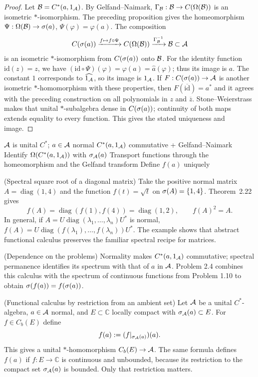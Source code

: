 \begin{proof}[Proof]
Let $\mathcal B=C^*(a,1_\mathcal A)$. By Gelfand--Naimark,
$\Gamma_\mathcal B:\mathcal B\to C(\Omega(\mathcal B))$ is an isometric $*$-isomorphism.
The preceding proposition gives the homeomorphism
$\Psi:\Omega(\mathcal B)\to\sigma(a)$, $\Psi(\varphi)=\varphi(a)$. The composition
\[
 C(\sigma(a))\xrightarrow{f\mapsto f\circ\Psi} C(\Omega(\mathcal B))
 \xrightarrow{\Gamma_\mathcal B^{-1}}\mathcal B\subset\mathcal A
\]
is an isometric $*$-isomorphism from $C(\sigma(a))$ onto $\mathcal B$.
For the identity function $\mathrm{id}(z)=z$, we have
$(\mathrm{id}\circ\Psi)(\varphi)=\varphi(a)=\widehat a(\varphi)$;
thus its image is $a$. The constant $1$ corresponds to
$\widehat{1_\mathcal A}$, so its image is $1_\mathcal A$.
If $F:C(\sigma(a))\to\mathcal A$ is another isometric $*$-homomorphism with these
properties, then $F(\overline{\mathrm{id}})=a^*$ and it agrees with the
preceding construction on all polynomials in $z$ and $\overline z$.
Stone--Weierstrass makes that unital $*$-subalgebra dense in
$C(\sigma(a))$; continuity of both maps extends equality to every
function. This gives the stated uniqueness and image.
\end{proof}

\proofdiagrambranch
{$\mathcal A$ is unital $C^*$; $a\in\mathcal A$ normal}
{$C^*(a,1_\mathcal A)$ commutative + Gelfand--Naimark}
{Identify $\Omega(C^*(a,1_\mathcal A))$ with $\sigma_\mathcal A(a)$}
{Transport functions through the homeomorphism and the Gelfand transform}
{Define $f(a)$ uniquely}

\begin{cthejemplo}{(Spectral square root of a diagonal matrix)}
Take the positive normal matrix
$A=\operatorname{diag}(1,4)$ and the function
$f(t)=\sqrt t$ on $\sigma(A)=\{1,4\}$. Theorem~2.22 gives
\[
 f(A)=\operatorname{diag}(f(1),f(4))
     =\operatorname{diag}(1,2),
 \qquad f(A)^2=A.
\]
In general, if
$A=U\operatorname{diag}(\lambda_1,\ldots,\lambda_n)U^*$ is normal,
$f(A)=U\operatorname{diag}(f(\lambda_1),\ldots,f(\lambda_n))U^*$.
The example shows that abstract functional calculus preserves the familiar
spectral recipe for matrices.
\end{cthejemplo}

\begin{cthnota}{(Dependence on the problems)}
Normality makes $C^*(a,1_\mathcal A)$ commutative; spectral permanence identifies
its spectrum with that of $a$ in $\mathcal A$. Problem 2.4 combines this calculus
with the spectrum of continuous functions from Problem 1.10 to obtain
$\sigma(f(a))=f(\sigma(a))$.
\end{cthnota}


\begin{cthdefinicion}{(Functional calculus by restriction from an ambient set)}
Let $\mathcal A$ be a unital $C^*$-algebra, $a\in\mathcal A$ normal, and $E\subset\mathbb C$
locally compact with $\sigma_\mathcal A(a)\subset E$. For $f\in C_b(E)$ define
\[
 f(a):=(f|_{\sigma_\mathcal A(a)})(a).
\]
This gives a unital $*$-homomorphism $C_b(E)\to\mathcal A$. The same formula
defines $f(a)$ if $f:E\to\mathbb C$ is continuous and unbounded, because its
restriction to the compact set $\sigma_\mathcal A(a)$ is bounded. Only that
restriction matters.
\end{cthdefinicion}

